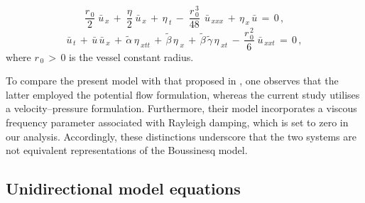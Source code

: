 \documentclass[alpha-refs, 12pt]{wiley-article}
\begin{document}
\begin{equation}\label{eq:bouss1}
  \frac{r_{\,0}}{2}\;\bar{u}_{\,x}\,+\;\frac{\eta}{2}\;\bar{u}_{\,x}\,+\,\eta_{\;t}\,-\;\frac{r_{\,0}^{\,3}}{48}\,\;\bar{u}_{\,xxx}\,+\,\eta_{\,x}\,\bar{u}\,=\,0\,,
\end{equation}
\begin{equation}\label{eq:bouss2}
  \bar{u}_{\,t}\, + \,\bar{u}\,\bar{u}_{\,x}\, + \,\tilde{\alpha}\,\eta_{\;xtt}\, + \,\tilde{\beta}\,\eta_{\;x}\, + \,\tilde{\beta}\,\tilde{\gamma}\,\eta_{\;xt}\, - \,\frac{r_{\,0}^{\,2}}{6}\;\bar{u}_{\,xxt}\, = \,0\,,
\end{equation}
where $r_{\,0}\,>\,0$ is the vessel constant radius.

To compare the present model with that proposed in \cite{Mitsotakis2019}, one observes that the latter employed the potential flow formulation, whereas the current study utilises a velocity–pressure formulation. Furthermore, their model incorporates a viscous frequency parameter associated with Rayleigh damping, which is set to zero in our analysis. Accordingly, these distinctions underscore that the two systems are not equivalent representations of the Boussinesq model.

\subsection{Unidirectional model equations}\label{sec:nondim}
\end{document}
